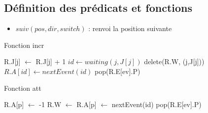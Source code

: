 \documentclass[12pt]{article}
\begin{document}
\subsection{Définition des prédicats et fonctions}

\begin{itemize}
    \item $suiv(pos, dir, switch)$ : renvoi la position suivante 
\end{itemize}

\iffalse
\begin{algorithm}
\caption{Fonction incr}
    \begin{algorithmic}[1]
         
            \State R.J[j] $\gets$ R.J[j] + 1
            \State $id \gets waiting(j,J[j])$ 
                \State delete(R.W, (j,J[j])) 
                \State $R.A[id] \gets nextEvent(id)$  
            \EndIf
            \State pop(R.E[ev].P) 
        \EndFunction
    \end{algorithmic}
\end{algorithm}


\begin{algorithm}
    \caption{Fonction att}
        \begin{algorithmic}[2]
         
                \State R.A[p] $\gets$ -1
                \State R.W $\gets$  
            \Else {}
                \State R.A[p] $\gets$ nextEvent(id)
            \EndIf
            \State pop(R.E[ev].P) 
        \EndFunction
    \end{algorithmic}
\end{algorithm}
\end{document}
